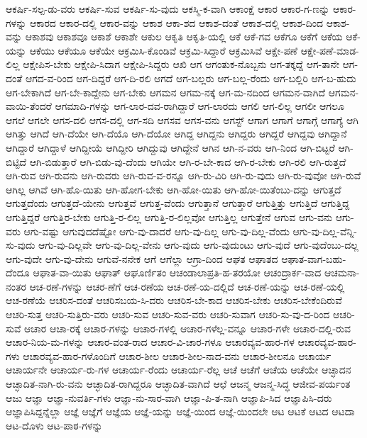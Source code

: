 {ಆಕರ್ಷಿ-ಸಲ್ಪ-ಡು-ವರು
ಆಕರ್ಷಿ-ಸುವ
ಆಕರ್ಷಿ-ಸು-ವುದು
ಆಕಸ್ಮಿ-ಕ-ವಾಗಿ
ಆಕಾಂಕ್ಷೆ
ಆಕಾರ
ಆಕಾರ-ಗ-ಣನ್ನು
ಆಕಾರ-ಗಳನ್ನು
ಆಕಾರದ
ಆಕಾರ-ದಲ್ಲಿ
ಆಕಾರ-ವನ್ನು
ಆಕಾಶ
ಆಕಾ-ಶದ
ಆಕಾಶ-ದಂತೆ
ಆಕಾಶ-ದಲ್ಲಿ
ಆಕಾಶ-ದಿಂದ
ಆಕಾಶ-ವನ್ನು
ಆಕಾಶವು
ಆಕಾಶವೂ
ಆಕಾಶೆ
ಆಕಾಶೇ
ಆಕುಲ
ಆಕೃತಿ
ಆಕೃತಿ-ಯಲ್ಲಿ
ಆಕೆ
ಆಕೆ-ಗವ
ಆಕೆಗೂ
ಆಕೆಗೆ
ಆಕೆಯ
ಆಕೆ-ಯನ್ನು
ಆಕೆಯು
ಆಕೆಯೂ
ಆಕೆಯೇ
ಆಕ್ರಮಿಸಿ-ಕೊಂಡಿವೆ
ಆಕ್ರಮಿ-ಸಿದ್ದಾರೆ
ಆಕ್ರಮಿಸಿವೆ
ಆಕ್ಷೇ-ಪಣೆ
ಆಕ್ಷೇ-ಪಣೆ-ಮಾಡ-ಲಿಲ್ಲ
ಆಕ್ಷೇಪಿಸ-ಬೇಕು
ಆಕ್ಷೇಪಿ-ಸಿದಾಗ
ಆಕ್ಷೇಪಿ-ಸಿದ್ದರು
ಆಖಿ
ಆಗ
ಆಗಂತುಕ-ನೊಬ್ಬನು
ಆಗ-ತಕ್ಕದ್ದೆ
ಆಗ-ತಾನೇ
ಆಗ-ದಂತೆ
ಆಗದ-ವ-ರಿಂದ
ಆಗ-ದಿದ್ದರೆ
ಆಗ-ದಿ-ರಲಿ
ಆಗದೆ
ಆಗ-ಬಲ್ಲರು
ಆಗ-ಬಲ್ಲ-ರೆಂದು
ಆಗ-ಬಲ್ಲಿರಿ
ಆಗ-ಬ-ಹುದು
ಆಗ-ಬೇಕಾಗಿದೆ
ಆಗ-ಬೇ-ಕಾದ್ದೇನು
ಆಗ-ಬೇಕು
ಆಗಮನ
ಆಗಮ-ನಕ್ಕೆ
ಆಗ-ಮ-ನದಿಂದ
ಆಗಮನ-ವಾಗಿದೆ
ಆಗಮನ-ವಾಯಿ-ತೆಂದರೆ
ಆಗಮಾದಿ-ಗಳನ್ನು
ಆಗ-ಲಾರ-ದವ-ರಾಗಿದ್ದಾರೆ
ಆಗ-ಲಾರದು
ಆಗಲಿ
ಆಗ-ಲಿಲ್ಲ
ಆಗಲೀ
ಆಗಲೂ
ಆಗಲೆ
ಆಗಲೇ
ಆಗಸ-ದಲಿ
ಆಗಸ-ದಲ್ಲಿ
ಆಗ-ಸದಿ
ಆಗಸವ
ಆಗಸ-ವನು
ಆಗಸ್ಟ್
ಆಗಾಗ
ಆಗಾಗೆ
ಆಗಾಗ್ಗೆ
ಆಗಾಗ್ಯೆ
ಆಗಿ
ಆಗಿತ್ತು
ಆಗಿದೆ
ಆಗಿ-ದೆಯೇ
ಆಗಿ-ದೆಯೊ
ಆಗಿ-ದೆಯೋ
ಆಗಿದ್ದ
ಆಗಿದ್ದನು
ಆಗಿದ್ದರು
ಆಗಿದ್ದರೆ
ಆಗಿದ್ದವು
ಆಗಿದ್ದಾನೆ
ಆಗಿದ್ದಾರೆ
ಆಗಿದ್ದಾಳೆ
ಆಗಿದ್ದೀಯೆ
ಆಗಿದ್ದೀರಿ
ಆಗಿದ್ದುವು
ಆಗಿದ್ದೇನೆ
ಆಗಿನ
ಆಗಿ-ನ-ವರು
ಆಗಿ-ನಿಂದ
ಆಗಿ-ಬಿಟ್ಟರೆ
ಆಗಿ-ಬಿಟ್ಟಿದೆ
ಆಗಿ-ಬಿಡುತ್ತಾರೆ
ಆಗಿ-ಬಿಡು-ವು-ದೆಂದು
ಆಗಿಯೇ
ಆಗಿ-ರ-ಬೇ-ಕಾದ
ಆಗಿ-ರ-ಬೇಕು
ಆಗಿ-ರಲಿ
ಆಗಿ-ರುತ್ತದೆ
ಆಗಿ-ರುವ
ಆಗಿ-ರುವನು
ಆಗಿ-ರುವರು
ಆಗಿ-ರುವ-ವ-ರನ್ನೂ
ಆಗಿ-ರು-ವಿರಿ
ಆಗಿ-ರು-ವುದು
ಆಗಿ-ರು-ವುವೋ
ಆಗಿ-ರುವೆ
ಆಗಿಲ್ಲ
ಆಗಿವೆ
ಆಗಿ-ಹೊ-ಯಿತು
ಆಗಿ-ಹೋಗ-ಬೇಕು
ಆಗಿ-ಹೋ-ಯಿತು
ಆಗಿ-ಹೋ-ಯಿತೆಂಬು-ದನ್ನು
ಆಗುತ್ತದೆ
ಆಗುತ್ತದೆಂದು
ಆಗುತ್ತದೆ-ಯೇನು
ಆಗುತ್ತವೆ
ಆಗುತ್ತ-ವೆಂದು
ಆಗುತ್ತಾನೆ
ಆಗುತ್ತಾರೆ
ಆಗುತ್ತಿತ್ತು
ಆಗುತ್ತಿದೆ
ಆಗುತ್ತಿದ್ದ
ಆಗುತ್ತಿದ್ದರೆ
ಆಗುತ್ತಿರ-ಬೇಕು
ಆಗುತ್ತಿ-ರ-ಲಿಲ್ಲ
ಆಗುತ್ತಿ-ರ-ಲಿಲ್ಲವೋ
ಆಗುತ್ತಿಲ್ಲ
ಆಗುತ್ತೇನೆ
ಆಗುವ
ಆಗು-ವನು
ಆಗು-ವರು
ಆಗು-ವಷ್ಟು
ಆಗುವುದದೆಷ್ಟೋ
ಆಗು-ವು-ದಾದರೆ
ಆಗು-ವು-ದಿಲ್ಲ
ಆಗು-ವು-ದಿಲ್ಲ-ವೆಂದು
ಆಗು-ವು-ದಿಲ್ಲ-ವೆನ್ನಿ-ಸು-ವುದು
ಆಗು-ವು-ದಿಲ್ಲವೇ
ಆಗು-ವು-ದಿಲ್ಲ-ವೇನು
ಆಗು-ವುದು
ಆಗು-ವುದುಂಟು
ಆಗು-ವುದೆ
ಆಗು-ವುದೆಂಬು-ದಲ್ಲ
ಆಗು-ವುದೇ
ಆಗು-ವು-ದೇನು
ಆಗುವೆ-ನನೇಕ
ಆಗೆ
ಆಗೆಲ್ಲಾ
ಆಗ್ರಾ-ದಿಂದ
ಆಘತ
ಆಘಾತದ
ಆಘಾತ-ವಾಗ-ಬಹು-ದೆಂದೂ
ಆಘಾತ-ವಾ-ಯಿತು
ಆಘಾತ್
ಆಘೂರ್ಣಿತಂ
ಆಚಂಡಾಲಾಪ್ರತಿ-ಹ-ತರಯೋ
ಆಚಂದ್ರಾರ್ಕ-ವಾದ
ಆಚಮನಾ-ನಂತರ
ಆಚ-ರಣೆ-ಗಳನ್ನು
ಆಚರ-ಣೆಗೆ
ಆಚ-ರಣೆಯ
ಆಚ-ರಣೆ-ಯ-ದಲ್ಲಿದೆ
ಆಚ-ರಣೆ-ಯನ್ನು
ಆಚ-ರಣೆ-ಯಲ್ಲಿ
ಆಚ-ರಣೆಯೆ
ಆಚರಿಸ-ದಂತೆ
ಆಚರಿಸಬಯ-ಸಿ-ದರು
ಆಚರಿಸ-ಬೇ-ಕಾದ
ಆಚರಿಸ-ಬೇಕು
ಆಚರಿಸ-ಬೇಕೆಂದಿರುವೆ
ಆಚರಿ-ಸುತ್ತ
ಆಚರಿ-ಸುತ್ತಿರು-ವರು
ಆಚರಿ-ಸುವ
ಆಚರಿ-ಸುವ-ವರು
ಆಚರಿ-ಸುವಾಗ
ಆಚರಿ-ಸು-ವು-ದ-ರಿಂದ
ಆಚರಿ-ಸುವೆ
ಆಚಾರ
ಆಚಾ-ರಕ್ಕೆ
ಆಚಾರ-ಗಳನ್ನು
ಆಚಾರ-ಗಳಲ್ಲಿ
ಆಚಾರ-ಗಳೆಲ್ಲ-ವನ್ನೂ
ಆಚಾರ-ಗಳೇ
ಆಚಾರ-ದಲ್ಲಿ-ರುವ
ಆಚಾರ-ನಿಯ-ಮ-ಗಳನ್ನು
ಆಚಾರ-ವಂತ-ರಾದ
ಆಚಾರ-ವಿ-ಚಾರ-ಗಳೂ
ಆಚಾರವ್ಯವ-ಹಾರ-ಗಳ
ಆಚಾರವ್ಯವ-ಹಾರ-ಗಳು
ಆಚಾರವ್ಯವ-ಹಾರ-ಗಳೊಂದಿಗೆ
ಆಚಾರ-ಶೀಲ
ಆಚಾರ-ಶೀಲ-ನಾದ-ವನು
ಆಚಾರ-ಶೀಲನೂ
ಆಚಾರ್ಯ
ಆಚಾರ್ಯನೇ
ಆಚಾರ್ಯ-ರು-ಗಳ
ಆಚಾರ್ಯ-ರೆಂದು
ಆಚಾರ್ಯ-ರೆಲ್ಲ
ಆಚೆ
ಆಚೆಗೆ
ಆಚೆಯ
ಆಚೆಯೇ
ಆಚ್ಛಾದನ
ಆಚ್ಛಾದಿತ-ನಾಗಿ-ರು-ವನು
ಆಚ್ಛಾದಿತ-ರಾಗಿದ್ದರೂ
ಆಚ್ಛಾದಿತ-ವಾಗಿದೆ
ಆಛೆ
ಆಜನ್ಮ
ಆಜನ್ಮ-ಸಿದ್ಧ
ಆಜೀವ-ಪರ್ಯಂತ
ಆಜು
ಆಜ್ಞಾ
ಆಜ್ಞಾ-ನುವರ್ತಿ-ಗಳು
ಆಜ್ಞಾ-ನು-ಸಾರ-ವಾಗಿ
ಆಜ್ಞಾ-ಪಿ-ತ-ನಾಗಿ
ಆಜ್ಞಾಪಿ-ಸಿದ
ಆಜ್ಞಾಪಿಸಿ-ದರು
ಆಜ್ಞಾಪಿಸಿದ್ದನ್ನೆಲ್ಲಾ
ಆಜ್ಞೆ
ಆಜ್ಞೆಗೆ
ಆಜ್ಞೆಯ
ಆಜ್ಞೆ-ಯನ್ನು
ಆಜ್ಞೆ-ಯಿಂದ
ಆಜ್ಞೆ-ಯಿಂದಲೇ
ಆಟ
ಆಟಕೆ
ಆಟದ
ಆಟದಾ
ಆಟ-ದೊಳು
ಆಟ-ಪಾಠ-ಗಳನ್ನು
}
